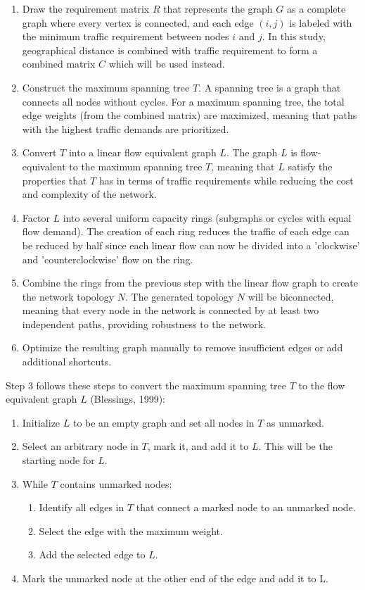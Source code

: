 \documentclass[11pt]{article}
\begin{document}
\begin{enumerate}
	\item Draw the requirement matrix $R$ that represents the graph $G$ as a complete graph where every vertex is connected, and each edge $\left(i,j\right)$ is labeled with the minimum traffic requirement between nodes $i$ and $j$. In this study, geographical distance is combined with traffic requirement to form a combined matrix $C$ which will be used instead. 
	\item Construct the maximum spanning tree $T$. A spanning tree is a graph that connects all nodes without cycles. For a maximum spanning tree, the total edge weights (from the combined matrix) are maximized, meaning that paths with the highest traffic demands are prioritized.
	\item Convert $T$ into a linear flow equivalent graph $L$. The graph $L$ is flow-equivalent to the maximum spanning tree $T$, meaning that $L$ satisfy the properties that $T$ has in terms of traffic requirements while reducing the cost and complexity of the network.
	\item Factor $L$ into several uniform capacity rings (subgraphs or cycles with equal flow demand). The creation of each ring reduces the traffic of each edge can be reduced by half since each linear flow can now be divided into a 'clockwise' and 'counterclockwise' flow on the ring.
	\item Combine the rings from the previous step with the linear flow graph to create the network topology $N$. The generated topology $N$ will be biconnected, meaning that every node in the network is connected by at least two independent paths, providing robustness to the network. 
	\item Optimize the resulting graph manually to remove insufficient edges or add additional shortcuts. 

\end{enumerate} \par
Step 3 follows these steps to convert the maximum spanning tree $T$ to the flow equivalent graph $L$ (Blessings, 1999):
\begin{enumerate}[label=\alph*.]
	\item Initialize $L$ to be an empty graph and set all nodes in $T$ as unmarked. 
	\item Select an arbitrary node in $T$, mark it, and add it to $L$. This will be the starting node for $L$.
	\item While $T$ contains unmarked nodes: \begin{enumerate}[label=\roman*.]
		\item Identify all edges in $T$ that connect a marked node to an unmarked node.
		\item Select the edge with the maximum weight.
		\item Add the selected edge to $L$. 
	\end{enumerate}
	\item Mark the unmarked node at the other end of the edge and add it to L.
\end{enumerate} \par
\end{document}
